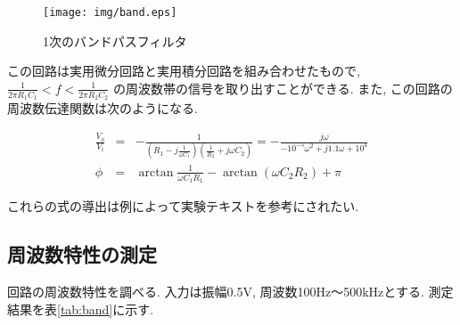 \documentclass[titlepage]{jsarticle}
\begin{document}
    \begin{figure}[h]
        \centering
        \texttt{[image: img/band.eps]}
        \caption{1次のバンドパスフィルタ}
        \label{fig:band}
    \end{figure}

    この回路は実用微分回路と実用積分回路を組み合わせたもので,
    $\displaystyle\frac{1}{2\pi R_1C_1} < f < \frac{1}{2\pi R_2C_2}$
    の周波数帯の信号を取り出すことができる.
    また, この回路の周波数伝達関数は次のようになる.

    \begin{eqnarray}
        \frac{V_o}{V_i} &=& -\frac{1}{\left(R_1-j\frac{1}{\omega C_1}\right)\left(\frac{1}{R_2}+j\omega C_2\right)} = -\frac{j\omega}{-10^{-5}\omega^2 + j1.1\omega + 10^{4}} \label{equ:band1} \\
        \phi &=& \arctan\frac{1}{\omega C_1R_1}-\arctan (\omega C_2R_2) + \pi \label{equ:band2}
    \end{eqnarray}

    これらの式の導出は例によって実験テキスト\cite{text}を参考にされたい.

    \subsection{周波数特性の測定}
        
        回路の周波数特性を調べる.
        入力は振幅0.5V,
        周波数100Hz〜500kHzとする.
        測定結果を表\ref{tab:band}に示す.
\end{document}
